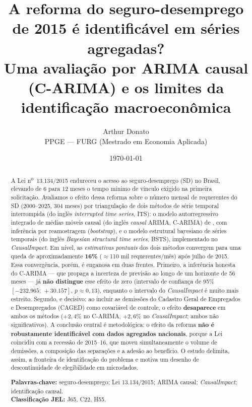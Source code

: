 \documentclass[12pt,a4paper]{article}
\title{\textbf{A reforma do seguro-desemprego de 2015 é identificável em séries agregadas?}\\[4pt]
\large Uma avaliação por ARIMA causal (C-ARIMA) e os limites da identificação macroeconômica}
\author{Arthur Donato\\
\small PPGE --- FURG (Mestrado em Economia Aplicada)}
\date{\today}
\begin{document}
\maketitle

\begin{abstract}
\noindent A Lei n\textsuperscript{o}~13.134/2015 endureceu o acesso ao seguro-desemprego (SD) no Brasil, elevando de 6 para 12 meses o tempo mínimo de vínculo exigido na primeira solicitação. Avaliamos o efeito dessa reforma sobre o número mensal de requerentes do SD (2000--2025, 304 meses) por triangulação de dois métodos de série temporal interrompida (do inglês \textit{interrupted time series}, ITS): o modelo autorregressivo integrado de médias móveis causal (do inglês \textit{causal} ARIMA, C-ARIMA) de \citet{menchetti2023carima}, com inferência por reamostragem (\textit{bootstrap}), e o modelo estrutural bayesiano de séries temporais (do inglês \textit{Bayesian structural time series}, BSTS), implementado no \textit{CausalImpact}. Em nível, as \textit{estimativas pontuais} dos dois métodos convergem para uma queda de aproximadamente \textbf{16\%} ($\approx$110 mil requerentes/mês) após julho de 2015. Essa convergência, porém, é enganosa em duas frentes. Primeiro, a inferência honesta do C-ARIMA --- que propaga a incerteza de previsão ao longo de um horizonte de 56 meses --- já \textbf{não distingue} esse efeito de zero (intervalo de confiança de 95\% $[-232{.}965;\,+30{.}157]$, $p\approx0{,}13$), enquanto o intervalo do \textit{CausalImpact} é muito mais estreito. Segundo, e decisivo: ao incluir as demissões do Cadastro Geral de Empregados e Desempregados (CAGED) como covariável de controle, o efeito \textbf{desaparece} em ambos os métodos ($+2{,}4\%$ no C-ARIMA, $+2{,}6\%$ no \textit{CausalImpact}; ambos não significativos). A conclusão central é metodológica: o efeito da reforma \textbf{não é robustamente identificável com dados agregados nacionais}, porque a Lei coincidiu com a recessão de 2015--16, que moveu simultaneamente o volume de demissões, a composição das separações e a adesão ao benefício. O estudo delimita, assim, a fronteira de identificação do problema e motiva um desenho de descontinuidade de elegibilidade em microdados.

\medskip
\noindent\textbf{Palavras-chave:} seguro-desemprego; Lei 13.134/2015; ARIMA causal; \textit{CausalImpact}; identificação causal.\\
\textbf{Classificação JEL:} J65, C22, H55.
\end{abstract}
\end{document}
